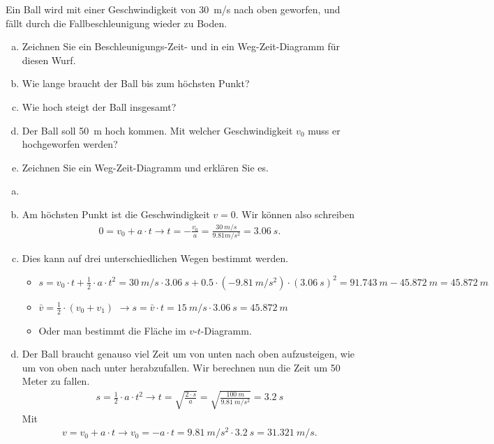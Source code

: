 

\begin{aufgabe}
Ein Ball wird mit einer Geschwindigkeit von \SI{30}{m/s} nach oben geworfen, und fällt
durch die Fallbeschleunigung wieder zu Boden.
\begin{enumerate}[a)]
	\item Zeichnen Sie ein Beschleunigungs-Zeit- und in ein Weg-Zeit-Diagramm für diesen Wurf.
	\item Wie lange braucht der Ball bis zum höchsten Punkt?
	\item Wie hoch steigt der Ball insgesamt?
	\item Der Ball soll \SI{50}{m} hoch kommen. Mit welcher Geschwindigkeit $v_0$ muss er hochgeworfen werden?
	\item Zeichnen Sie ein Weg-Zeit-Diagramm und erklären Sie es.
\end{enumerate}


\begin{loesung}
	\begin{enumerate}[a)]
		\item
		\item Am höchsten Punkt ist die Geschwindigkeit $v=0$. 
		Wir können also schreiben
		\begin{eqnarray*}
		0 = v_0 + a\cdot t \to t=-\frac{v_0}{a}=\frac{\SI{30}{m/s}}{{9.81}{m/s^2}}=\SI{3.06}{s}.
		\end{eqnarray*}

	\item Dies kann auf drei unterschiedlichen Wegen bestimmt werden. 
\begin{itemize}
	\item $s=v_0\cdot t +\frac{1}{2}\cdot a \cdot t^2 = \SI{30}{m/s}\cdot\SI{3.06}{s}+0.5\cdot(\SI{-9.81}{m/s^2})\cdot(\SI{3.06}{s})^2=\SI{91.743}{m}-\SI{45.872}{m}=\SI{45.872}{m}$
	\item $\bar{v}=\frac{1}{2}\cdot (v_0+v_1)$ $\to s=\bar{v}\cdot t=\SI{15}{m/s}\cdot\SI{3.06}{s}=\SI{45.872}{m}$
	\item Oder man bestimmt die Fläche im $v$-$t$-Diagramm.
\end{itemize}
	\item Der Ball braucht genauso viel Zeit um von unten nach oben aufzusteigen, wie um von oben nach unter herabzufallen.
		Wir berechnen nun die Zeit um 50 Meter zu fallen.
		\begin{eqnarray*}
			s=\frac{1}{2}\cdot a\cdot t^2 \to t=\sqrt{\frac{2\cdot s}{a}}=\sqrt{\frac{\SI{100}{m}}{\SI{9.81}{m/s^2}}}=\SI{3.2}{s}
		\end{eqnarray*}
		Mit
		\begin{eqnarray*}
			v=v_0 + a\cdot t\to v_0=-a\cdot t=\SI{9.81}{m/s^2}\cdot\SI{3.2}{s}=\SI{31.321}{m/s}\text{.}
		\end{eqnarray*}


\end{enumerate}
\end{loesung}
\end{aufgabe}
